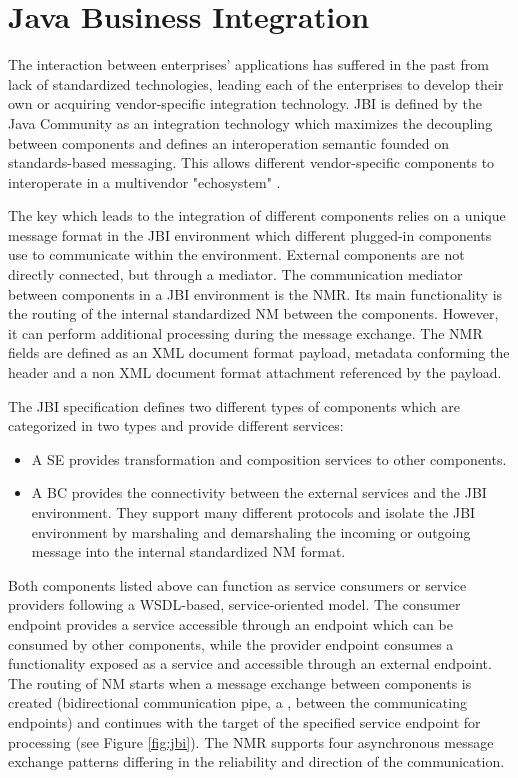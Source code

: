 \section{Java Business Integration}
\label{sec:jbi}

The interaction between enterprises' applications has suffered in the past from lack of standardized technologies, leading each of the enterprises to develop their own or acquiring vendor-specific integration technology. \ac{JBI} is defined by the Java Community as an integration technology which maximizes the decoupling between components and defines an interoperation semantic founded on standards-based messaging. This allows different vendor-specific components to interoperate in a multivendor "echosystem" \cite{JBI2005}. 

The key which leads to the integration of different components relies on a unique message format in the \ac{JBI} environment which different plugged-in components use to communicate within the environment. External components are not directly connected, but through a mediator. The communication mediator between components in a \ac{JBI} environment is the \ac{NMR}. Its main functionality is the routing of the internal standardized \ac{NM} between the components. However, it can perform additional processing during the message exchange. The \ac{NMR} fields are defined as an \ac{XML} document format payload, metadata conforming the header and a non \ac{XML} document format attachment referenced by the payload.

The \ac{JBI} specification defines two different types of components which are categorized in two types and provide different services:
	\begin{itemize}
		\item A \ac{SE} provides transformation and composition services to other components.
		\item A \ac{BC} provides the connectivity between the external services and the \ac{JBI} environment. They support many different protocols and isolate the \ac{JBI} environment by marshaling and demarshaling the incoming or outgoing message into the internal standardized \ac{NM} format.
	\end{itemize} 
	
Both components listed above can function as service consumers or service providers following a \ac{WSDL}-based, service-oriented model. The consumer endpoint provides a service accessible through an endpoint which can be consumed by other components, while the provider endpoint consumes a functionality exposed as a service and accessible through an external endpoint. The routing of \ac{NM} starts when a message exchange between components is created (bidirectional communication pipe, a , between the communicating endpoints) and continues with the target of the specified service endpoint for processing (see Figure \ref{fig:jbi}). The \ac{NMR} supports four asynchronous message exchange patterns differing in the reliability and direction of the communication.

